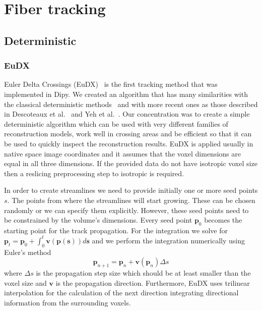 \documentclass{bioinfo}
\begin{document}
\section{Fiber tracking}
\subsection{Deterministic}

\subsubsection{EuDX}
Euler Delta Crossings (EuDX)~\citep{Garyfallidis_thesis} is the first tracking method that was implemented in Dipy. We created an algorithm that has many similarities with the classical deterministic methods~\citep{Mori1999, conturo-lori-etal:99, basser-pajevic-etal:00} and with more recent ones as those described in Descoteaux et al.~\citep{descoteaux-deriche-etal:09} and Yeh et al.~\citep{yeh-etal:10}. Our concentration was to create a simple deterministic algorithm which can be used with very different families of reconstruction models, work well in crossing areas and be efficient so that it can be used to quickly inspect the reconstruction results. EuDX is applied usually in native space image coordinates and it assumes that the voxel dimensions are equal in all three dimensions. If the provided data do not have isotropic voxel size then a reslicing preprocessing step to isotropic is required.

In order to create streamlines we need to provide initially one or more seed points $s$. The points from where the streamlines will start growing. These can be chosen randomly or we can specify them explicitly. However, these seed points need to be constrained by the volume's dimensions. Every seed point $\mathbf{p}_{0}$ becomes the starting point for the track propagation. For the integration we solve
for $\mathbf{p}_{t}=\mathbf{p}_{0}+\int_{0}^{t}\mathbf{v}(\mathbf{p}(\mathbf{s}))d\mathbf{s}$ and we perform the integration numerically using Euler's method
\begin{equation}
\mathbf{p}_{n+1}=\mathbf{p}_{n}+\mathbf{v}(\mathbf{p}_{n})\Delta s\label{eq:euler}
\end{equation}
\noindent where $\Delta s$ is the propagation step size which should be at least smaller than the voxel size and $\mathbf{v}$ is the propagation direction. Furthermore, EuDX uses trilinear interpolation for the calculation of the next direction integrating directional information from the surrounding voxels.
\end{document}
